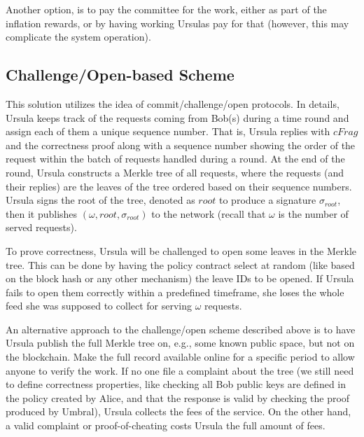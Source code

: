 Another option, is to pay the committee for the work, either as 
part of the inflation rewards, or by having working Ursulas pay for 
that (however, this may complicate the system operation).


\subsection{Challenge/Open-based Scheme}
This solution utilizes the idea of commit/challenge/open protocols. 
In details, Ursula keeps track of the requests coming from Bob(s) 
during a time round and assign each of them a unique sequence 
number. That is, Ursula replies with $cFrag$ and the correctness proof 
along with a sequence number showing the order of the request within 
the batch of requests handled during a round. At the end of the round, 
Ursula constructs a Merkle tree of all requests, where 
the requests (and their replies) are the leaves of the tree ordered based on their sequence 
numbers. Ursula signs the root of the tree, denoted as $root$ to produce 
a signature $\sigma_{root}$, then it publishes $(\omega, root, \sigma_{root})$ 
to the network (recall that $\omega$ is the number of served requests). 


To prove correctness, Ursula will be challenged to open some leaves in the Merkle tree. 
This can be done by having the policy contract select at random (like based 
on the block hash or any other mechanism) the leave IDs to be opened. If 
Ursula fails to open them correctly within a predefined timeframe, she loses the 
whole feed she was supposed to collect for serving $\omega$ requests.


An alternative approach to the challenge/open scheme described above is to 
have Ursula publish the full Merkle tree on, e.g., some known public space, but 
not on the blockchain. Make the full record available online for a specific period 
to allow anyone to verify the work. If no one file a complaint about the tree (we 
still need to define correctness properties, like checking all Bob public keys are 
defined in the policy created by Alice, and that the response is valid by checking the 
proof produced by Umbral), Ursula collects the fees of the service. On the other 
hand, a valid complaint or proof-of-cheating costs Ursula the full amount of fees.